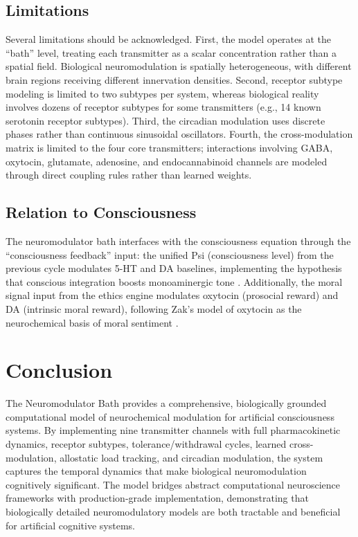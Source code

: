 \documentclass[11pt,a4paper]{article}
\begin{document}
\subsection{Limitations}

Several limitations should be acknowledged. First, the model operates at the ``bath'' level, treating each transmitter as a scalar concentration rather than a spatial field. Biological neuromodulation is spatially heterogeneous, with different brain regions receiving different innervation densities. Second, receptor subtype modeling is limited to two subtypes per system, whereas biological reality involves dozens of receptor subtypes for some transmitters (e.g., 14 known serotonin receptor subtypes). Third, the circadian modulation uses discrete phases rather than continuous sinusoidal oscillators. Fourth, the cross-modulation matrix is limited to the four core transmitters; interactions involving GABA, oxytocin, glutamate, adenosine, and endocannabinoid channels are modeled through direct coupling rules rather than learned weights.

\subsection{Relation to Consciousness}

The neuromodulator bath interfaces with the consciousness equation through the ``consciousness feedback'' input: the unified Psi (consciousness level) from the previous cycle modulates 5-HT and DA baselines, implementing the hypothesis that conscious integration boosts monoaminergic tone \citep{dehaene2006}. Additionally, the moral signal input from the ethics engine modulates oxytocin (prosocial reward) and DA (intrinsic moral reward), following Zak's model of oxytocin as the neurochemical basis of moral sentiment \citep{zak2012}.

\section{Conclusion}

The Neuromodulator Bath provides a comprehensive, biologically grounded computational model of neurochemical modulation for artificial consciousness systems. By implementing nine transmitter channels with full pharmacokinetic dynamics, receptor subtypes, tolerance/withdrawal cycles, learned cross-modulation, allostatic load tracking, and circadian modulation, the system captures the temporal dynamics that make biological neuromodulation cognitively significant. The model bridges abstract computational neuroscience frameworks with production-grade implementation, demonstrating that biologically detailed neuromodulatory models are both tractable and beneficial for artificial cognitive systems.
\end{document}

